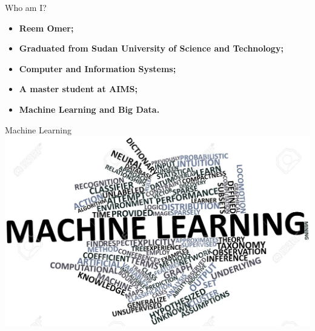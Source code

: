 \documentclass[11pt]{beamer}
\begin{document}
\begin{frame}{Who am I?}	

\begin{itemize}
\item \textbf{Reem Omer;} \newline
\item \textbf{Graduated from Sudan University of Science and Technology;}\newline
\item \textbf{Computer and Information Systems;} \newline
\item \textbf{A master student at AIMS;}\newline
\item \textbf{Machine Learning and Big Data.}
\end{itemize}
\end{frame}
\usebackgroundtemplate{}
\begin{frame}{Machine Learning}
\includegraphics[scale=0.2]{1}
\end{frame}
\end{document}
